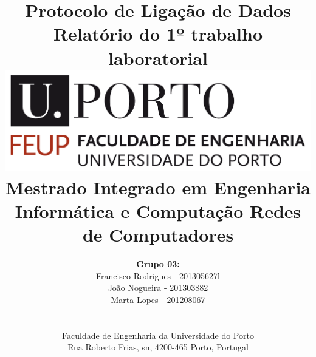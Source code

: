 \documentclass[11pt]{article}
\begin{document}
\setlength{\textwidth}{16cm}
\setlength{\textheight}{22cm}

\title{\Huge\textbf{Protocolo de Ligação de Dados}\linebreak\linebreak\linebreak
\Large\textbf{Relatório do 1º trabalho laboratorial}\linebreak
\linebreak\linebreak
\includegraphics[scale=0.1]{feup-logo.png}\linebreak
\linebreak\linebreak
\Large{Mestrado Integrado em Engenharia Informática e Computação} \linebreak\linebreak
\Large{Redes de Computadores}
}

\author{\textbf{Grupo 03:}\\
Francisco Rodrigues - 201305627l\\
João Nogueira - 201303882 \\
Marta Lopes - 201208067 \\
\linebreak\linebreak \\
 \\ Faculdade de Engenharia da Universidade do Porto \\ Rua Roberto Frias, s\/n, 4200-465 Porto, Portugal \linebreak\linebreak\linebreak
\linebreak\linebreak\vspace{1cm}}

\maketitle
\thispagestyle{empty}
\end{document}
